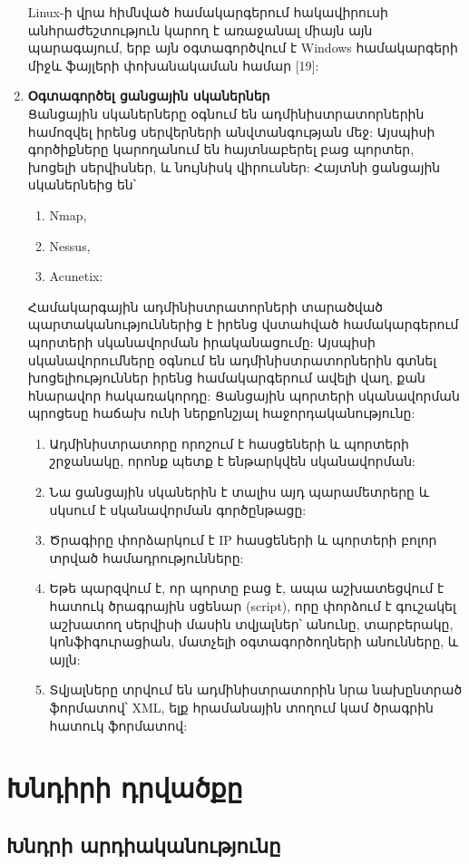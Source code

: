 \documentclass[a4paper,12pt]{article}
\begin{document}
\begin{sloppypar}
\begin{enumerate}
	Linux-ի վրա հիմնված համակարգերում հակավիրուսի անհրաժեշտություն կարող է
	առաջանալ միայն այն պարագայում, երբ այն օգտագործվում է Windows համակարգերի
	միջև ֆայլերի փոխանակաման համար [19]:
\item \textbf{Օգտագործել ցանցային սկաներներ}\\
    Ցանցային սկաներները օգնում են ադմինիստրատորներին համոզվել իրենց
    սերվերների անվտանգության մեջ: Այսպիսի գործիքները կարողանում են
    հայտնաբերել բաց պորտեր, խոցելի սերվիսներ, և նույնիսկ վիրուսներ:
    Հայտնի ցանցային սկաներնեից են՝
    \begin{enumerate}
        \item Nmap,
        \item Nessus,
        \item Acunetix:
    \end{enumerate}
	Համակարգային ադմինիստրատորների տարածված պարտականություններից է իրենց
	վստահված համակարգերում պորտերի սկանավորման իրականացումը:
	Այսպիսի սկանավորումները օգնում են ադմինիստրատորներին գտնել խոցելիություններ
	իրենց համակարգերում ավելի վաղ, քան հնարավոր հակառակորդը:
	Ցանցային պորտերի սկանավորման պրոցեսը հաճախ ունի ներքոնշյալ հաջորդականությունը:

	\begin{enumerate}
	\item Ադմինիստրատորը որոշում է հասցեների և պորտերի շրջանակը, որոնք պետք է
		ենթարկվեն սկանավորման:
	\item Նա ցանցային սկաներին է տալիս այդ պարամետրերը և սկսում է
		սկանավորման գործընթացը:
	\item Ծրագիրը փորձարկում է IP հասցեների և պորտերի բոլոր տրված
		համադրությունները:
	\item Եթե պարզվում է, որ պորտը բաց է, ապա աշխատեցվում է հատուկ ծրագրային
		սցենար (script), որը փորձում է գուշակել աշխատող սերվիսի մասին տվյալներ՝
		անունը, տարբերակը, կոնֆիգուրացիան, մատչելի օգտագործողների անունները,
		և այլն:
	\item Տվյալները տրվում են ադմինիստրատորին նրա նախընտրած ֆորմատով՝
		XML, ելք հրամանային տողում կամ ծրագրին հատուկ ֆորմատով:
	\end{enumerate}
\end{enumerate}


\section{Խնդիրի դրվածքը}


\subsection{Խնդրի արդիականությունը}



\end{sloppypar}
\end{document}
